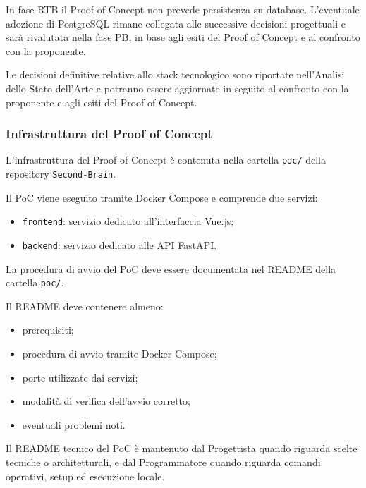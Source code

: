 In fase RTB il Proof of Concept non prevede persistenza su database. L'eventuale
adozione di PostgreSQL rimane collegata alle successive decisioni progettuali e
sarà rivalutata nella fase PB, in base agli esiti del Proof of Concept e al
confronto con la proponente.

Le decisioni definitive relative allo stack tecnologico sono riportate
nell'Analisi dello Stato dell'Arte e potranno essere aggiornate in seguito al
confronto con la proponente e agli esiti del Proof of Concept.


\subsubsection{Infrastruttura del Proof of Concept}

L'infrastruttura del Proof of Concept è contenuta nella cartella \texttt{poc/}
della repository \texttt{Second-Brain}.

Il PoC viene eseguito tramite Docker Compose e comprende due servizi:

\begin{itemize}
    \item \texttt{frontend}: servizio dedicato all'interfaccia Vue.js;
    \item \texttt{backend}: servizio dedicato alle API FastAPI.
\end{itemize}

La procedura di avvio del PoC deve essere documentata nel README della cartella
\texttt{poc/}.

Il README deve contenere almeno:

\begin{itemize}
    \item prerequisiti;
    \item procedura di avvio tramite Docker Compose;
    \item porte utilizzate dai servizi;
    \item modalità di verifica dell'avvio corretto;
    \item eventuali problemi noti.
\end{itemize}

Il README tecnico del PoC è mantenuto dal Progettista quando riguarda scelte
tecniche o architetturali, e dal Programmatore quando riguarda comandi operativi,
setup ed esecuzione locale.


